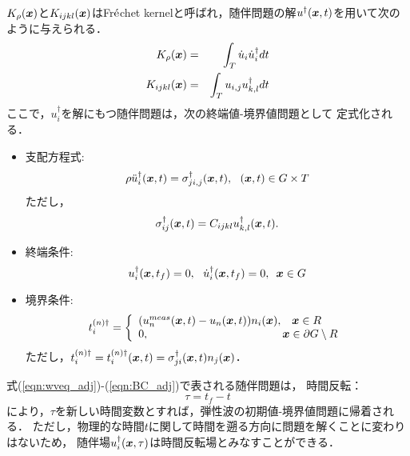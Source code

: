 %
$K_\rho(\boldsymbol{x})$と$K_{ijkl}(\boldsymbol{x})$はFr$\acute{\rm e}$chet 
kernelと呼ばれ，随伴問題の解$u^{\dagger}(\boldsymbol{x},t)$を用いて次のように与えられる\cite{Fichtner}．
\begin{eqnarray}
	K_\rho(\boldsymbol{x}) &= & \int _T \dot{u}_i \dot{u}^{\dagger}_i dt 
	\label{eqn:K_rho}
	\\
	K_{ijkl}(\boldsymbol{x}) &= & \int _T u_{i,j} u^{\dagger}_{k,l} dt 
	\label{eqn:K_ijkl}
\end{eqnarray}
ここで，$u_i^{\dagger}$を解にもつ随伴問題は，次の終端値-境界値問題として
定式化される．
\begin{itemize}
\item
支配方程式:
\begin{equation}
	\rho \ddot{u}_i^{\dagger}(\fat{x},t) =
	\sigma^{\dagger}_{ji,j}(\fat{x},t), \ \ 
	(\fat{x},t) \in G\times T
	\label{eqn:wveq_adj}
\end{equation}
ただし，
\begin{equation}
	\sigma_{ij}^{\dagger}(\boldsymbol{x},t)= C_{ijkl}u_{k,l}^{\dagger}(\boldsymbol{x},t).
	\label{eqn:sigma_dgg}
\end{equation}
\item 
終端条件:
\begin{equation}
	u_i^{\dagger}(\boldsymbol{x},t_f) =0,  \ \
	\dot{u}_i^{\dagger}(\boldsymbol{x},t_f) =0,  \ \, \boldsymbol{x}\in G
	\label{eqn:IC_adj}
\end{equation}
\item
境界条件:
\begin{equation}
	t_i^{(n)\dagger}
	=
	\left\{
		\begin{array}{ll}
			(
			u_n^{meas}(\fat{x},t)
			-
			u_n(\fat{x},t)
			)n_i(\fat{x}), & \fat{x}\in R \\
			0, & \hspace{-3mm} \fat{x} \in \partial G\setminus R
		\end{array}
	\right.
	\label{eqn:BC_adj}
\end{equation}
ただし，$t_i^{(n)\dagger}=t_i^{(n)\dagger}(\boldsymbol{x},t)=\sigma_{ji}^{\dagger}(\boldsymbol{x},t)n_j(\boldsymbol{x})$．
\end{itemize}
式(\ref{eqn:wveq_adj})-(\ref{eqn:BC_adj})で表される随伴問題は，
時間反転：
\begin{equation}
	\tau=t_f-t
	\label{eqn:tau_def}
\end{equation}
により，$\tau$を新しい時間変数とすれば，弾性波の初期値-境界値問題に帰着される．
ただし，物理的な時間$t$に関して時間を遡る方向に問題を解くことに変わりはないため，
随伴場$u_i^{\dagger}(\boldsymbol{x},\tau)$は時間反転場とみなすことができる．
